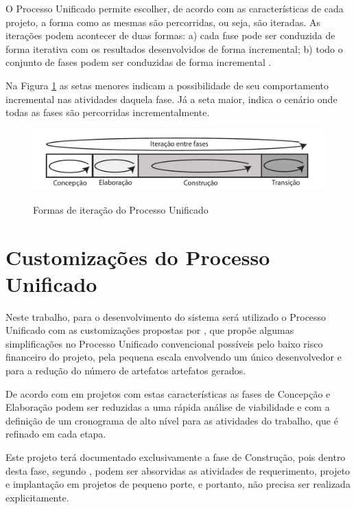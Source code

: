 O Processo Unificado permite escolher, de acordo com as características de cada projeto, a forma como as mesmas são percorridas, ou seja, são iteradas. As iterações podem acontecer de duas formas: a) cada fase pode ser conduzida de forma iterativa com os resultados desenvolvidos de forma incremental; b) todo o conjunto de fases podem ser conduzidas de forma incremental \cite{sommerville10}.

Na Figura \ref{fig:processo_unificado_iteracoes} as setas menores indicam a possibilidade de seu comportamento incremental nas atividades daquela fase. Já a seta maior, indica o cenário onde todas as fases são percorridas incrementalmente.

\begin{figure}[!h]
\centering
\caption{Formas de iteração do Processo Unificado}
\includegraphics[width=1.0\textwidth]{pdfs/img-processo-unificado-fases.pdf}
\label{fig:processo_unificado_iteracoes} 
\end{figure}

\section{Customizações do Processo Unificado}

Neste trabalho, para o desenvolvimento do sistema será utilizado o Processo Unificado com as customizações propostas por , que propõe algumas simplificações no Processo Unificado convencional possíveis pelo baixo risco financeiro do projeto, pela pequena escala envolvendo um único desenvolvedor e para a redução do número de artefatos artefatos gerados.

De acordo com  em projetos com estas características as fases de Concepção e Elaboração podem ser reduzidas a uma rápida análise de viabilidade e com a definição de um cronograma de alto nível para as atividades do trabalho, que é refinado em cada etapa.

Este projeto terá documentado exclusivamente a fase de Construção, pois dentro desta fase, segundo , podem ser absorvidas as atividades de requerimento, projeto e implantação em projetos de pequeno porte, e portanto, não precisa ser realizada explicitamente.

